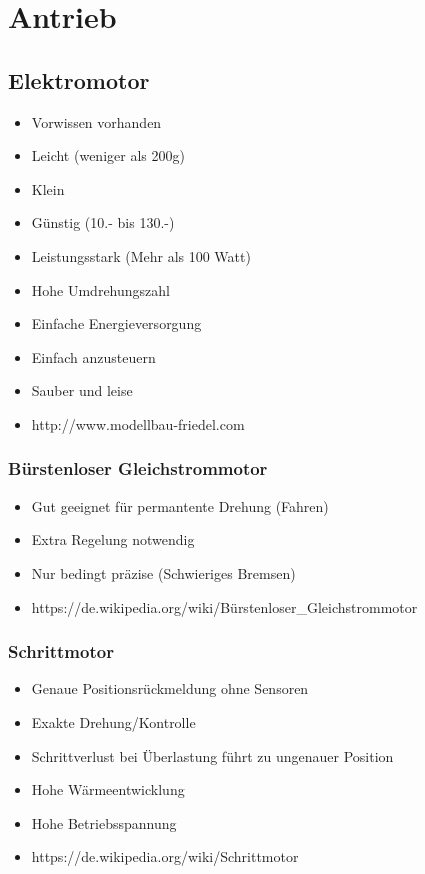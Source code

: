 \section{Antrieb}

\subsection{Elektromotor}
\begin{itemize}
\item Vorwissen vorhanden
\item Leicht (weniger als 200g)
\item Klein
\item Günstig (10.- bis 130.-)
\item Leistungsstark (Mehr als 100 Watt)
\item Hohe Umdrehungszahl
\item Einfache Energieversorgung
\item Einfach anzusteuern
\item Sauber und leise
\item http://www.modellbau-friedel.com
\end{itemize}

\subsubsection{Bürstenloser Gleichstrommotor}
\begin{itemize}
\item Gut geeignet für permantente Drehung (Fahren)
\item Extra Regelung notwendig
\item Nur bedingt präzise (Schwieriges Bremsen)
\item https://de.wikipedia.org/wiki/Bürstenloser_Gleichstrommotor
\end{itemize}

\subsubsection{Schrittmotor}
\begin{itemize}
\item Genaue Positionsrückmeldung ohne Sensoren
\item Exakte Drehung/Kontrolle
\item Schrittverlust bei Überlastung führt zu ungenauer Position
\item Hohe Wärmeentwicklung
\item Hohe Betriebsspannung
\item https://de.wikipedia.org/wiki/Schrittmotor
\end{itemize}


